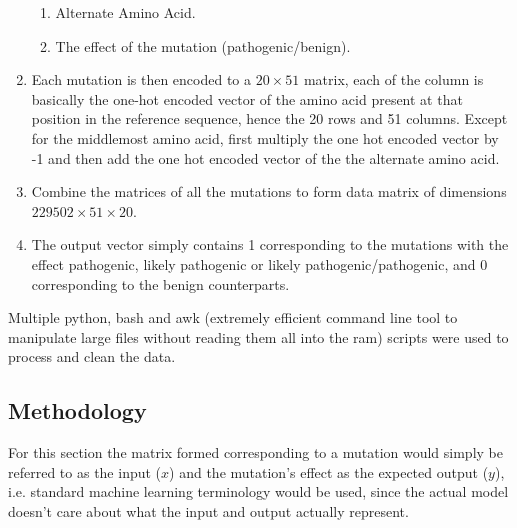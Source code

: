 \documentclass[twoside]{article}
\begin{document}
\begin{enumerate}
\begin{enumerate}
			\item Alternate Amino Acid.
			\item The effect of the mutation (pathogenic/benign).
		\end{enumerate}
		\item Each mutation is then encoded to a $20 \times 51$ matrix, each of the column is basically the one-hot encoded vector of the amino acid present at that position in the reference sequence, hence the 20 rows and 51 columns. Except for the middlemost amino acid, first multiply the one hot encoded vector by -1 and then add the one hot encoded vector of the the alternate amino acid.
		\item Combine the matrices of all the mutations to form data matrix of dimensions $229502 \times 51 \times 20$.
		\item The output vector simply contains 1 corresponding to the mutations with the effect pathogenic, likely pathogenic or likely pathogenic/pathogenic, and 0 corresponding to the benign counterparts.
	\end{enumerate}

	Multiple python, bash and awk (extremely efficient command line tool to manipulate large files without reading them all into the ram) scripts were used to process and clean the data.
	
	\pagebreak
	
	
	\subsection{Methodology}
	For this section the matrix formed corresponding to a mutation would simply be referred to as the input ($x$) and the mutation's effect as the expected output ($y$), i.e. standard machine learning terminology would be used, since the actual model doesn't care about what the input and output actually represent.
	
\end{document}
